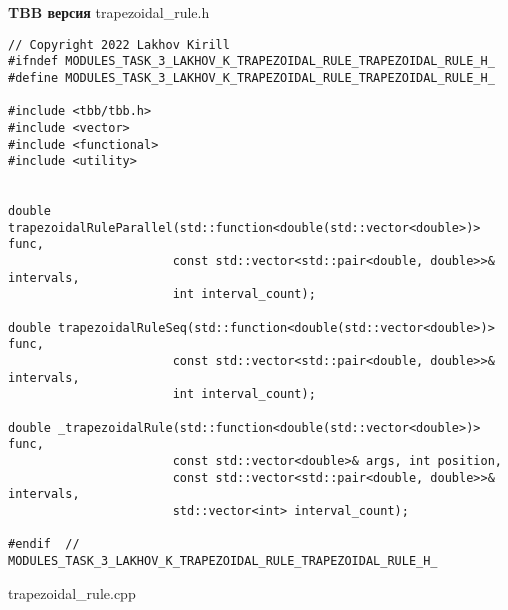 \documentclass{report}
\begin{document}
\textbf{TBB версия}
\newline
\newline trapezoidal\_rule.h
\begin{lstlisting}
// Copyright 2022 Lakhov Kirill
#ifndef MODULES_TASK_3_LAKHOV_K_TRAPEZOIDAL_RULE_TRAPEZOIDAL_RULE_H_
#define MODULES_TASK_3_LAKHOV_K_TRAPEZOIDAL_RULE_TRAPEZOIDAL_RULE_H_

#include <tbb/tbb.h>
#include <vector>
#include <functional>
#include <utility>


double trapezoidalRuleParallel(std::function<double(std::vector<double>)> func,
                       const std::vector<std::pair<double, double>>& intervals,
                       int interval_count);

double trapezoidalRuleSeq(std::function<double(std::vector<double>)> func,
                       const std::vector<std::pair<double, double>>& intervals,
                       int interval_count);

double _trapezoidalRule(std::function<double(std::vector<double>)> func,
                       const std::vector<double>& args, int position,
                       const std::vector<std::pair<double, double>>& intervals,
                       std::vector<int> interval_count);

#endif  // MODULES_TASK_3_LAKHOV_K_TRAPEZOIDAL_RULE_TRAPEZOIDAL_RULE_H_
\end{lstlisting}
trapezoidal\_rule.cpp
\end{document}
